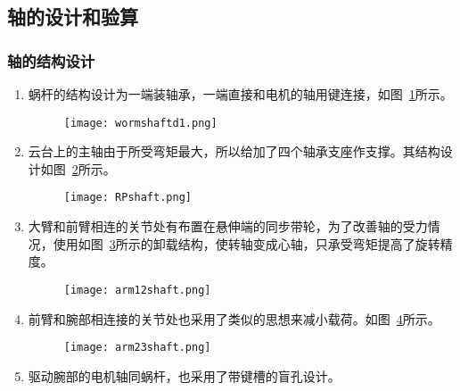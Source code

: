 
\subsection{轴的设计和验算}

\subsubsection{轴的结构设计}

\begin{enumerate}
    \item   蜗杆的结构设计为一端装轴承，一端直接和电机的轴用键连接，如图~\ref{fig:wormsd1}所示。
        \begin{figure}
            \centering
            \texttt{[image: wormshaftd1.png]}
            \label{fig:wormsd1}
        \end{figure}

    \item   云台上的主轴由于所受弯矩最大，所以给加了四个轴承支座作支撑。其结构设计如图~\ref{fig:rpmain}所示。
        \begin{figure}
            \centering
            \texttt{[image: RPshaft.png]}
            \label{fig:rpmain}
        \end{figure}

    \item   大臂和前臂相连的关节处有布置在悬伸端的同步带轮，为了改善轴的受力情况，使用如图~\ref{fig:arm12s}所示的卸载结构，使转轴变成心轴，只承受弯矩提高了旋转精度。
        \begin{figure}
            \centering
            \texttt{[image: arm12shaft.png]}
            \label{fig:arm12s}
        \end{figure}

    \item   前臂和腕部相连接的关节处也采用了类似的思想来减小载荷。如图~\ref{fig:arm23s}所示。
        \begin{figure}
            \centering
            \texttt{[image: arm23shaft.png]}
            \label{fig:arm23s}
        \end{figure}

    \item   驱动腕部的电机轴同蜗杆，也采用了带键槽的盲孔设计。
\end{enumerate}

